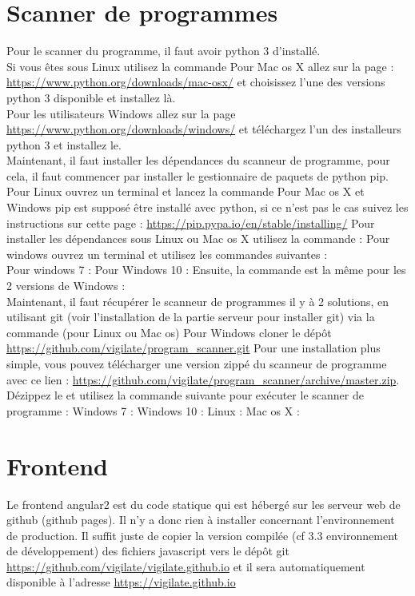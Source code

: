 \section{Scanner de programmes}
Pour le scanner du programme, il faut avoir python 3 d'installé.\\
Si vous êtes sous Linux utilisez la commande
Pour Mac os X allez sur la page : \url{https://www.python.org/downloads/mac-osx/} et choisissez l’une des versions python 3 disponible et installez là.\\
Pour les utilisateurs Windows allez sur la page \url{https://www.python.org/downloads/windows/} et téléchargez l’un des installeurs python 3 et installez le.
\\
Maintenant, il faut installer les dépendances du scanneur de programme, pour cela, il faut commencer par installer le gestionnaire de paquets de python pip. Pour Linux ouvrez un terminal et lancez la commande
Pour Mac os X et Windows pip est supposé être installé avec python, si ce n’est pas le cas suivez les instructions sur cette page : \url{https://pip.pypa.io/en/stable/installing/}
Pour installer les dépendances sous Linux ou Mac os X utilisez la commande :
Pour windows ouvrez un terminal et utilisez les commandes suivantes :\\
Pour windows 7 :
Pour Windows 10 :
Ensuite, la commande est la même pour les 2 versions de Windows :
\\
Maintenant, il faut récupérer le scanneur de programmes il y à 2 solutions, en utilisant git (voir l’installation de la partie serveur pour installer git) via la commande (pour Linux ou Mac os)
Pour Windows cloner le dépôt \url{https://github.com/vigilate/program_scanner.git}
Pour une installation plus simple, vous pouvez télécharger une version zippé du scanneur de programme avec ce lien : \url{https://github.com/vigilate/program_scanner/archive/master.zip}.\\Dézippez le et utilisez la commande suivante pour exécuter le scanner de programme : Windows 7 : 
Windows 10 : 
Linux : 
Mac os X : 

\section{Frontend}
Le frontend angular2 est du code statique qui est hébergé sur les serveur web de github (github pages). Il n’y a donc rien à installer concernant l’environnement de production. Il suffit juste de copier la version compilée (cf 3.3 environnement de développement) des fichiers javascript vers le dépôt git \url{https://github.com/vigilate/vigilate.github.io} et il sera automatiquement disponible à l'adresse \url{https://vigilate.github.io}